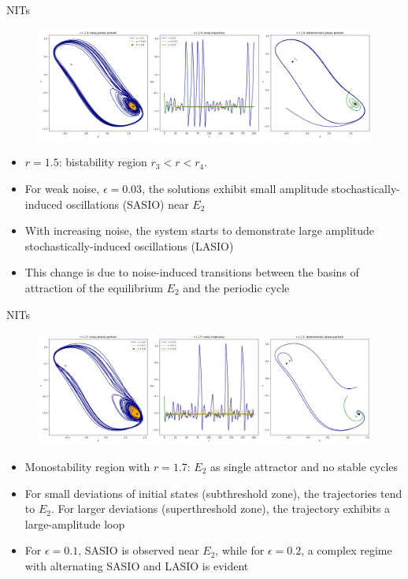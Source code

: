 \documentclass[10pt]{beamer}
\begin{document}
\begin{frame}{NITs}
	\begin{figure}
		\includegraphics[width=\textwidth, height=\textheight,keepaspectratio]{./figures_2/NIT-r1.5.png}
	\end{figure}

	\begin{itemize}
		\item $r = 1.5$: bistability region $r_3 < r < r_4$.
		\item For weak noise, $\epsilon=0.03$, the solutions exhibit small
		amplitude stochastically-induced oscillations (SASIO) near $E_2$
		\item With increasing noise, the system starts to demonstrate large amplitude 
		stochastically-induced oscillations (LASIO)
		\item This change is due to noise-induced 
		transitions between the basins of attraction of the equilibrium 
		$E_2$ and the periodic cycle
	\end{itemize}
\end{frame}

\begin{frame}{NITs}
	\begin{figure}
		\includegraphics[width=\textwidth, height=0.52\textheight,keepaspectratio]{./figures_2/NIT-r1.7.png}
	\end{figure}

	\begin{itemize}
		\item Monostability region with $r=1.7$: $E_2$ as single attractor and no stable cycles
		\item For small deviations of initial states (subthreshold zone), the trajectories 
		tend to $E_2$. For larger deviations (superthreshold zone), the 
		trajectory exhibits a large-amplitude loop
		\item For $\epsilon = 0.1$, SASIO is observed near $E_2$, while for 
		$\epsilon = 0.2$, a complex regime with alternating SASIO and LASIO is evident
	\end{itemize}
\end{frame}
\end{document}

